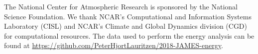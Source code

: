 \documentclass{agujournal}
\begin{document}
\acknowledgments
The National Center for Atmospheric Research is sponsored by the National Science Foundation. We thank NCAR's Computational and Information Systems Laboratory (CISL) and NCAR's Climate and Global Dynamics division (CGD) for computational resources. The data used to perform the energy analysis can be found at {\url{https://github.com/PeterHjortLauritzen/2018-JAMES-energy}}.










\end{document}
